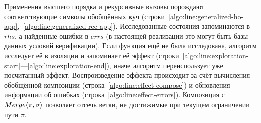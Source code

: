 Применения высшего порядка и рекурсивные вызовы порождают соответствующие символы обобщённых куч (строки~\ref{algo:line:generalized-ho-app},~\ref{algo:line:generalized-rec-app}). Исследованные состояния запоминаются в $rhs$, а найденные ошибки в $errs$ (в настоящей реализации это могут быть базы данных условий верификации). Если функция ещё не была исследована, алгоритм исследует её в изоляции и запоминает её эффект (строки~\ref{algo:line:exploration-start}---\ref{algo:line:exploration-end}), иначе алгоритм переиспользует уже посчитанный эффект. Воспроизведение эффекта происходит за счёт вычисления обобщённой композиции (строка~\ref{algo:line:effect-compose}) и обновления информации об ошибках (строка~\ref{algo:line:effect-errors}). Композиция с $Merge\langle\pi, \sigma\rangle$ позволяет отсечь ветки, не достижимые при текущем ограничении пути $\pi$.

